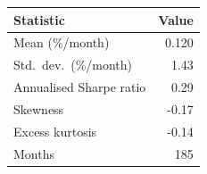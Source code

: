 \begin{tabular}{lr}
\toprule
Statistic & Value \\
\midrule
Mean (\%/month) & 0.120 \\
Std.\ dev.\ (\%/month) & 1.43 \\
Annualised Sharpe ratio & 0.29 \\
Skewness & -0.17 \\
Excess kurtosis & -0.14 \\
Months & 185 \\
\bottomrule
\end{tabular}